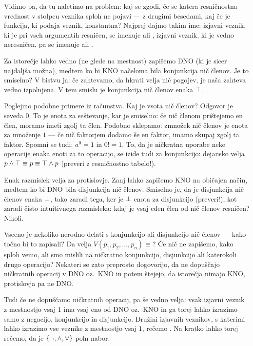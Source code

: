 		Vidimo pa, da tu naletimo na problem: kaj se zgodi, če se katera resničnostna vrednost v stolpcu veznika sploh ne pojavi --- z drugimi besedami, kaj če je funkcija, ki podaja veznik, konstantna? Najprej dajmo takim ime: izjavni veznik, ki je pri vseh argumentih resničen, se imenuje  ali , izjavni veznik, ki je vedno neresničen, pa se imenuje  ali .
		
		Za istorečje lahko vedno (ne glede na mestnost) zapišemo DNO (ki je sicer najdaljša možna), medtem ko bi KNO načeloma bila konjunkcija nič členov. Je to smiselno? V bistvu ja: če zahtevamo, da hkrati velja nič pogojev, je naša zahteva vedno izpolnjena. V tem smislu je konjunkcija nič členov enaka $\top$.
		
		Poglejmo podobne primere iz računstva. Kaj je vsota nič členov? Odgovor je seveda $0$. To je enota za seštevanje, kar je smiselno: če nič členom prištejemo en člen, moramo imeti zgolj ta člen. Podobno sklepamo: zmnožek nič členov je enota za množenje $1$ --- če nič faktorjem dodamo še en faktor, imamo skupaj zgolj ta faktor. Spomni se tudi: $a^0 = 1$ in $0! = 1$. To, da je ničkratna uporabe neke operacije enaka enoti za to operacijo, se izide tudi za konjunkcijo: dejansko velja $p \land \top \equiv p \equiv \top \land p$ (preveri z resničnostno tabelo!).
		
		Enak razmislek velja za protislovje. Zanj lahko zapišemo KNO na običajen način, medtem ko bi DNO bila disjunkcija nič členov. Smiselno je, da je disjunkcija nič členov enaka $\bot$, tako zaradi tega, ker je $\bot$ enota za disjunkcijo (preveri!), kot zaradi čisto intuitivnega razmisleka: kdaj je vsaj eden člen od nič členov resničen? Nikoli.
		
		Vseeno je nekoliko nerodno delati s konjunkcijo ali disjunkcijo nič členov --- kako točno bi to zapisali? Da velja $V(p_1, p_2, \ldots, p_n) \equiv $? Če nič ne zapišemo, kako sploh vemo, ali smo mislili na ničkratno konjunkcijo, disjunkcijo ali katerokoli drugo operacijo? Nekateri se zato preprosto dogovorijo, da ne dopuščajo ničkratnih operacij v DNO oz.~KNO in potem štejejo, da istorečja nimajo KNO, protislovja pa ne DNO.
		
		Tudi če ne dopuščamo ničkratnih operacij, pa še vedno velja: vsak izjavni veznik z mestnostjo vsaj $1$ ima vsaj eno od DNO oz.~KNO in ga torej lahko izrazimo samo z negacijo, konjunkcijo in disjunkcijo. Družini izjavnih veznikov, s katerimi lahko izrazimo vse veznike z mestnostjo vsaj $1$, rečemo . Na kratko lahko torej rečemo, da je $\set{\lnot, \land, \lor}$ poln nabor.
		
